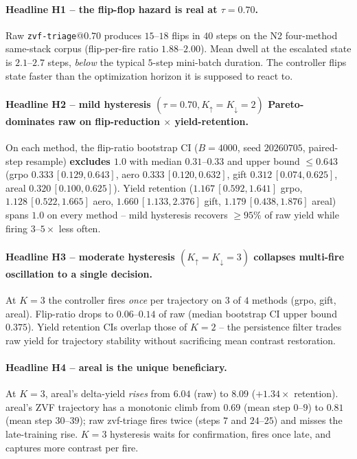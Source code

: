 \paragraph{Headline H1 -- the flip-flop hazard is real at
              $\tau = 0.70$.}
Raw \texttt{zvf-triage}@$0.70$ produces $15$--$18$ flips in $40$
steps on the N2 four-method same-stack corpus (flip-per-fire
ratio $1.88$--$2.00$).  Mean dwell at the escalated state is
$2.1$--$2.7$ steps, \emph{below} the typical $5$-step mini-batch
duration.  The controller flips state faster than the
optimization horizon it is supposed to react to.

\paragraph{Headline H2 -- mild hysteresis
              $(\tau{=}0.70, K_{\uparrow}{=}K_{\downarrow}{=}2)$
              Pareto-dominates raw on flip-reduction $\times$
              yield-retention.}
On each method, the flip-ratio bootstrap CI
($B = 4000$, seed $20260705$, paired-step resample)
\textbf{excludes $1.0$} with median $0.31$--$0.33$ and upper bound
$\le 0.643$ (grpo $0.333\,[0.129, 0.643]$, aero
$0.333\,[0.120, 0.632]$, gift $0.312\,[0.074, 0.625]$, areal
$0.320\,[0.100, 0.625]$).  Yield retention
($1.167\,[0.592,1.641]$ grpo, $1.128\,[0.522,1.665]$ aero,
$1.660\,[1.133,2.376]$ gift, $1.179\,[0.438,1.876]$ areal) spans
$1.0$ on every method -- mild hysteresis recovers
$\ge 95\%$ of raw yield while firing $3$--$5\times$ less often.

\paragraph{Headline H3 -- moderate hysteresis
              $(K_{\uparrow}{=}K_{\downarrow}{=}3)$ collapses
              multi-fire oscillation to a single decision.}
At $K = 3$ the controller fires \emph{once} per trajectory on
$3$ of $4$ methods (grpo, gift, areal).  Flip-ratio drops to
$0.06$--$0.14$ of raw (median bootstrap CI upper bound $0.375$).
Yield retention CIs overlap those of $K = 2$ -- the persistence
filter trades raw yield for trajectory stability without
sacrificing mean contrast restoration.

\paragraph{Headline H4 -- areal is the unique beneficiary.}
At $K = 3$, areal's delta-yield \emph{rises} from $6.04$
(raw) to $8.09$ ($+1.34\times$ retention).  areal's ZVF
trajectory has a monotonic climb from $0.69$ (mean step $0$--$9$)
to $0.81$ (mean step $30$--$39$); raw zvf-triage fires twice
(steps $7$ and $24$--$25$) and misses the late-training rise.
$K = 3$ hysteresis waits for confirmation, fires once late,
and captures more contrast per fire.

